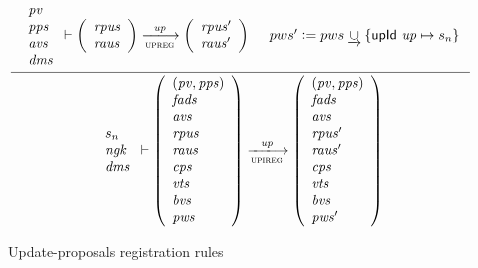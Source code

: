 \begin{figure}[htb]
  \begin{equation}
    \label{eq:rule:upi-reg-interface}
    \inference
    {
      {
        \begin{array}{l}
          \var{pv}\\
          \var{pps}\\
          \var{avs}\\
          \var{dms}
        \end{array}
      }
      \vdash
      {
        \left(
          \begin{array}{l}
            \var{rpus}\\
            \var{raus}
          \end{array}
        \right)
      }
      \trans{upreg}{\var{up}}
      {
        \left(
          \begin{array}{l}
            \var{rpus'}\\
            \var{raus'}
          \end{array}
        \right)
      }
      &
      pws' \leteq pws \unionoverrideRight \{ \upId{up} \mapsto s_n\}
    }
    {
      {
        \begin{array}{l}
          s_n\\
          \var{ngk}\\
          \var{dms}
        \end{array}
      }
      \vdash
      {
        \left(
          \begin{array}{l}
            (\var{pv}, \var{pps})\\
            \var{fads}\\
            \var{avs}\\
            \var{rpus}\\
            \var{raus}\\
            \var{cps}\\
            \var{vts}\\
            \var{bvs}\\
            \var{pws}
          \end{array}
        \right)
      }
      \trans{upireg}{\var{up}}
      {
        \left(
          \begin{array}{l}
            (\var{pv}, \var{pps})\\
            \var{fads}\\
            \var{avs}\\
            \var{rpus'}\\
            \var{raus'}\\
            \var{cps}\\
            \var{vts}\\
            \var{bvs}\\
            \var{pws'}
          \end{array}
        \right)
      }
    }
  \end{equation}
  \caption{Update-proposals registration rules}
  \label{fig:rules:upi-reg-interface}
\end{figure}

